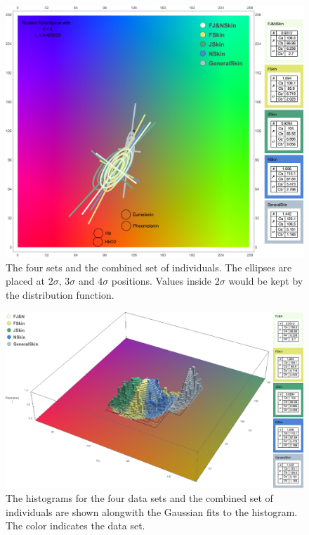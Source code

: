 \begin{figure}[h!]
  \centering
    \includegraphics[width=\textwidth]{Chapter3/Figs/All_Together_2D.jpg}
    \caption{The four sets and the combined set of individuals. The ellipses are placed at $2\sigma$, $3\sigma$ and $4\sigma$ positions. Values inside $2\sigma$ would be kept by the distribution function.}  \label{fig:AllTogether2D}
\end{figure}


\begin{figure}[h!]
  \centering
    \includegraphics[width=\textwidth]{Chapter3/Figs/All_Together_3D.jpg}
    \caption{The histograms for the four data sets and the combined set of individuals are shown alongwith the Gaussian fits to the histogram. The color indicates the data set.}  \label{fig:AllTogether3D}
\end{figure}

